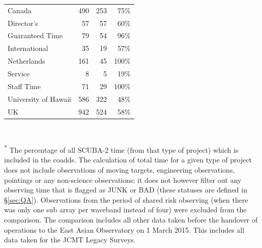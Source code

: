 \documentclass[usenatbib]{mnras}
\newcommand{\todo}[1]{\textcolor{red}{TODO: #1}}
\newcommand{\status}[1]{\textsf{#1}}
\begin{document}
\begin{table}
{\begin{tabular}{l r r r}
      \hspace{0.5cm} Canada         & 490 & 253 &  75\% \\
      \hspace{0.5cm} Director's     &  57 &  57 &  60\% \\
      \hspace{0.5cm} Guaranteed Time&  79 &  54 &  96\% \\
      \hspace{0.5cm} International  &  35 &  19 &  57\% \\
      \hspace{0.5cm} Netherlands    & 161 &  45 & 100\% \\
      \hspace{0.5cm} Service        &   8 &   5 &  19\% \\
      \hspace{0.5cm} Staff Time     &  71 &  29 & 100\% \\
      \hspace{0.5cm} University of Hawaii   & 586 & 322 &  48\% \\
      \hspace{0.5cm} UK             & 942 & 524 &  58\% \\

      \hline

    \end{tabular}\\
  }
  {\noindent\scriptsize \textsuperscript{*} The percentage of all
    SCUBA-2 time (from that type of project) which is included in the
    coadds. The calculation of total time for a given type of project
    does not include observations of moving targets, engineering
    observations, pointings or any non-science observations; it
    does not however filter out any observing time that is flagged as
    \status{JUNK} or \status{BAD} (these statuses are defined in
    \S\ref{sec:QA}). Observations from the period of shared risk
    observing (when there was only one sub array per waveband instead
    of four) were excluded from the comparison. The comparison
    includes all other data taken before the handover of operations to
    the East Asian Observatory on 1 March 2015. This includes all data
    taken for the JCMT Legacy Surveys. }

\end{table}

\end{document}
